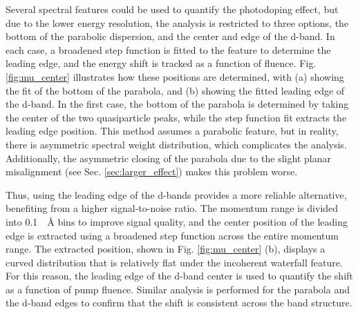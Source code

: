Several spectral features could be used to quantify the photodoping effect, but due to the lower energy resolution, the analysis is restricted to three options, the bottom of the parabolic dispersion, and the center and edge of the  d-band.
In each case, a broadened step function is fitted to the feature to determine the leading edge, and the energy shift is tracked as a function of fluence.
Fig. \ref{fig:mu_center} illustrates how these positions are determined, with (a) showing the fit of the bottom of the parabola, and (b) showing the fitted leading edge of the  d-band.
In the first case, the bottom of the parabola is determined by taking the center of the two quasiparticle peaks, while the step function fit extracts the leading edge position.
This method assumes a parabolic feature, but in reality, there is asymmetric spectral weight distribution, which complicates the analysis.
Additionally, the asymmetric closing of the parabola due to the slight planar misalignment (see Sec. \ref{sec:larger_effect}) makes this problem worse.

Thus, using the leading edge of the  d-bands provides a more reliable alternative, benefiting from a higher signal-to-noise ratio.
The momentum range is divided into \qty{0.1}{\per\angstrom} bins to improve signal quality, and the center position of the leading edge is extracted using a broadened step function across the entire momentum range.
The extracted position, shown in Fig. \ref{fig:mu_center} (b), displays a curved distribution that is relatively flat under the incoherent waterfall feature.
For this reason, the leading edge of the  d-band center is used to quantify the shift as a function of pump fluence.
Similar analysis is performed for the parabola and the d-band edges to confirm that the shift is consistent across the band structure.

